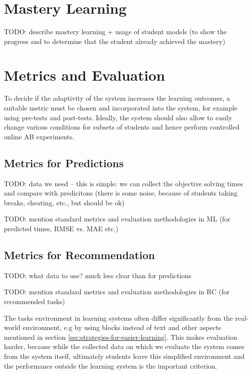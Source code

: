 
\section{Mastery Learning}
\label{sec:mastery-learning}

TODO: describe mastery learning + usage of student models (to show the progress
and to determine that the student already achieved the mastery)


\section{Metrics and Evaluation}
\label{sec:metrics-and-evaluation}

To decide if the adaptivity of the system increases the learning outcomes,
  a suitable metric must be chosen and incorporated into the system,
  for example using pre-tests and post-tests.
Ideally, the system should also allow to easily change various conditions
  for subsets of students and hence perform controlled online AB experiments.


\subsection{Metrics for Predictions}

TODO: data we need -- this is simple: we can collect the objective solving times and compare
with predicitons (there is some noise, because of students taking breaks, cheating, etc., but should be ok)

TODO: mention standard metrics and evaluation methodologies in ML (for
predicted times, RMSE vs. MAE etc.)


\subsection{Metrics for Recommendation}

TODO: what data to use? much less clear than  for predictions

TODO: mention standard metrics and evaluation methodologies in RC (for recommended tasks)

The tasks environment in learning systems often differ significantly
  from the real-world environment,
  e.g by using blocks instead of text
  and other aspects mentioned in section \ref{sec:strategies-for-easier-learning}.
This makes evaluation harder, because while the collected data on which we
  evaluate the system comes from the system itself,
  ultimately students leave this simplified environment
  and the performance outside the learning system is the important criterion.

